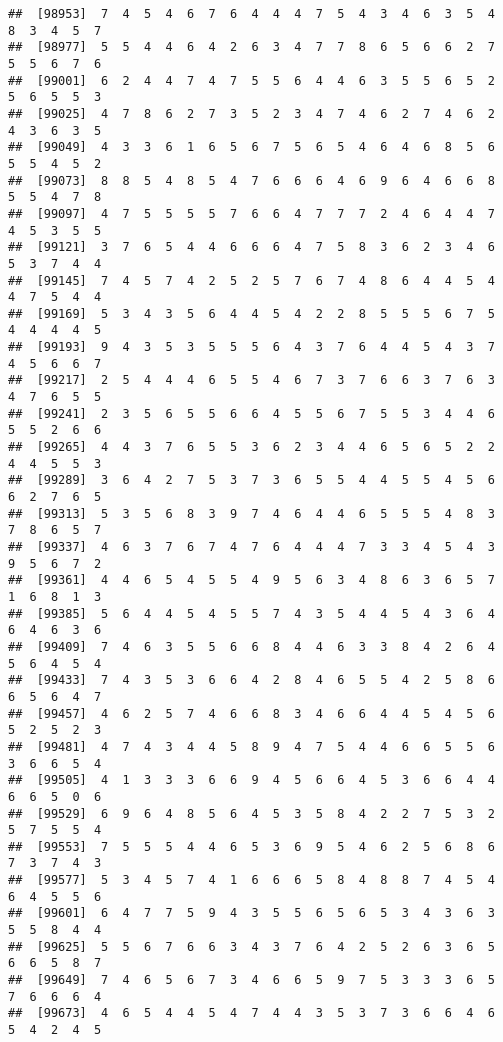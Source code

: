 \documentclass[
]{book}
\begin{document}
\begin{verbatim}
##  [98953]  7  4  5  4  6  7  6  4  4  4  7  5  4  3  4  6  3  5  4  8  3  4  5  7
##  [98977]  5  5  4  4  6  4  2  6  3  4  7  7  8  6  5  6  6  2  7  5  5  6  7  6
##  [99001]  6  2  4  4  7  4  7  5  5  6  4  4  6  3  5  5  6  5  2  5  6  5  5  3
##  [99025]  4  7  8  6  2  7  3  5  2  3  4  7  4  6  2  7  4  6  2  4  3  6  3  5
##  [99049]  4  3  3  6  1  6  5  6  7  5  6  5  4  6  4  6  8  5  6  5  5  4  5  2
##  [99073]  8  8  5  4  8  5  4  7  6  6  6  4  6  9  6  4  6  6  8  5  5  4  7  8
##  [99097]  4  7  5  5  5  5  7  6  6  4  7  7  7  2  4  6  4  4  7  4  5  3  5  5
##  [99121]  3  7  6  5  4  4  6  6  6  4  7  5  8  3  6  2  3  4  6  5  3  7  4  4
##  [99145]  7  4  5  7  4  2  5  2  5  7  6  7  4  8  6  4  4  5  4  4  7  5  4  4
##  [99169]  5  3  4  3  5  6  4  4  5  4  2  2  8  5  5  5  6  7  5  4  4  4  4  5
##  [99193]  9  4  3  5  3  5  5  5  6  4  3  7  6  4  4  5  4  3  7  4  5  6  6  7
##  [99217]  2  5  4  4  4  6  5  5  4  6  7  3  7  6  6  3  7  6  3  4  7  6  5  5
##  [99241]  2  3  5  6  5  5  6  6  4  5  5  6  7  5  5  3  4  4  6  5  5  2  6  6
##  [99265]  4  4  3  7  6  5  5  3  6  2  3  4  4  6  5  6  5  2  2  4  4  5  5  3
##  [99289]  3  6  4  2  7  5  3  7  3  6  5  5  4  4  5  5  4  5  6  6  2  7  6  5
##  [99313]  5  3  5  6  8  3  9  7  4  6  4  4  6  5  5  5  4  8  3  7  8  6  5  7
##  [99337]  4  6  3  7  6  7  4  7  6  4  4  4  7  3  3  4  5  4  3  9  5  6  7  2
##  [99361]  4  4  6  5  4  5  5  4  9  5  6  3  4  8  6  3  6  5  7  1  6  8  1  3
##  [99385]  5  6  4  4  5  4  5  5  7  4  3  5  4  4  5  4  3  6  4  6  4  6  3  6
##  [99409]  7  4  6  3  5  5  6  6  8  4  4  6  3  3  8  4  2  6  4  5  6  4  5  4
##  [99433]  7  4  3  5  3  6  6  4  2  8  4  6  5  5  4  2  5  8  6  6  5  6  4  7
##  [99457]  4  6  2  5  7  4  6  6  8  3  4  6  6  4  4  5  4  5  6  5  2  5  2  3
##  [99481]  4  7  4  3  4  4  5  8  9  4  7  5  4  4  6  6  5  5  6  3  6  6  5  4
##  [99505]  4  1  3  3  3  6  6  9  4  5  6  6  4  5  3  6  6  4  4  6  6  5  0  6
##  [99529]  6  9  6  4  8  5  6  4  5  3  5  8  4  2  2  7  5  3  2  5  7  5  5  4
##  [99553]  7  5  5  5  4  4  6  5  3  6  9  5  4  6  2  5  6  8  6  7  3  7  4  3
##  [99577]  5  3  4  5  7  4  1  6  6  6  5  8  4  8  8  7  4  5  4  6  4  5  5  6
##  [99601]  6  4  7  7  5  9  4  3  5  5  6  5  6  5  3  4  3  6  3  5  5  8  4  4
##  [99625]  5  5  6  7  6  6  3  4  3  7  6  4  2  5  2  6  3  6  5  6  6  5  8  7
##  [99649]  7  4  6  5  6  7  3  4  6  6  5  9  7  5  3  3  3  6  5  7  6  6  6  4
##  [99673]  4  6  5  4  4  5  4  7  4  4  3  5  3  7  3  6  6  4  6  5  4  2  4  5

\end{verbatim}
\end{document}
